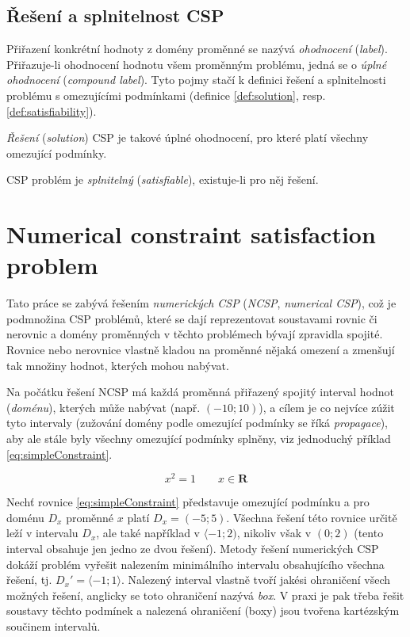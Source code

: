 \subsection{Řešení a splnitelnost CSP}
Přiřazení konkrétní hodnoty z domény proměnné se nazývá \emph{ohodnocení} (\emph{label}). Přiřazuje-li ohodnocení hodnotu všem proměnným problému, jedná se o \emph{úplné ohodnocení} (\emph{compound label}). Tyto pojmy stačí k definici řešení a splnitelnosti problému s omezujícími podmínkami (definice \ref{def:solution}, resp. \ref{def:satisfiability}).

\begin{definition}
\label{def:solution}
\emph{Řešení} (\emph{solution}) CSP je takové úplné ohodnocení, pro které platí všechny omezující podmínky.
\end{definition}

\begin{definition}
\label{def:satisfiability}
CSP problém je \emph{splnitelný} (\emph{satisfiable}), existuje-li pro něj řešení.
\end{definition}


\section{Numerical constraint satisfaction problem}

Tato práce se zabývá řešením \emph{numerických CSP} (\emph{NCSP}, \emph{numerical CSP}), což je podmnožina CSP problémů, které se dají reprezentovat soustavami rovnic či nerovnic a domény proměnných v těchto problémech bývají zpravidla spojité. Rovnice nebo nerovnice vlastně kladou na proměnné nějaká omezení a zmenšují tak množiny hodnot, kterých mohou nabývat.

Na počátku řešení NCSP má každá proměnná přiřazený spojitý interval hodnot (\emph{doménu}), kterých může nabývat (např. $(-10;10)$), a cílem je co nejvíce zúžit tyto intervaly (zužování domény podle omezující podmínky se říká \emph{propagace}), aby ale stále byly všechny omezující podmínky splněny, viz jednoduchý příklad \ref{eq:simpleConstraint}.

\begin{equation} \label{eq:simpleConstraint}
x^2 = 1\qquad x \in \boldsymbol{R}
\end{equation}

Nechť rovnice \ref{eq:simpleConstraint} představuje omezující podmínku a pro doménu $D_x$ proměnné $x$ platí $D_x = (-5;5)$. Všechna řešení této rovnice určitě leží v intervalu $D_x$, ale také například v $\langle -1;2)$, nikoliv však v $(0;2)$ (tento interval obsahuje jen jedno ze dvou řešení). Metody řešení numerických CSP dokáží problém vyřešit nalezením minimálního intervalu obsahujícího všechna řešení, tj. $D_x' = \langle -1;1\rangle$. Nalezený interval vlastně tvoří jakési ohraničení všech možných řešení, anglicky se toto ohraničení nazývá \emph{box}. V praxi je pak třeba řešit soustavy těchto podmínek a nalezená ohraničení (boxy) jsou tvořena kartézským součinem intervalů.

